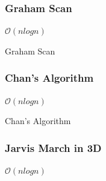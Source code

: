 \documentclass{beamer}
\begin{document}
  
  \begin{frame}
    \frametitle{Graham Scan}
    
    \begin{center}
      
      $\mathcal{O}(n log n)$
    \end{center}
  \end{frame}
  
  \begin{frame}{Graham Scan}
    \end{frame}
    
    
    \begin{frame}
      \frametitle{Chan's Algorithm}
      
      \begin{center}
        $\mathcal{O}(n log n)$
      \end{center}
    \end{frame}
    
    \begin{frame}{Chan's Algorithm}
      \end{frame}
      
      
      \begin{frame}
        \frametitle{Jarvis March in 3D}
        
        \begin{center}
          
          $\mathcal{O}(n log n)$
        \end{center}
      \end{frame}
      
      
\end{document}
